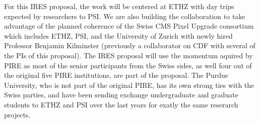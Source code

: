   For this IRES proposal, the work will be centered at ETHZ with day
  trips expected by researchers to PSI. We are also building the
  collaboration to take advantage of the planned coherence of the
  Swiss CMS Pixel Upgrade consortium which includes ETHZ, PSI, and the
  University of Zurich with newly hired Professor Benjamin Kilminster
  (previously a collaborator on CDF with several of the PIs of this
  proposal). The IRES proposal will use the momentum aquired by PIRE
  as most of the senior participants from the Swiss sides, as well
  four out of the original five PIRE institutions, are part of the 
  proposal. The Purdue University, who is not part of the original PIRE,
  has its own strong ties with the Swiss parties, and have been sending
  exchange undergraduate and graduate students to ETHZ and PSI over
  the last years for exatly the same reserarch projects.
